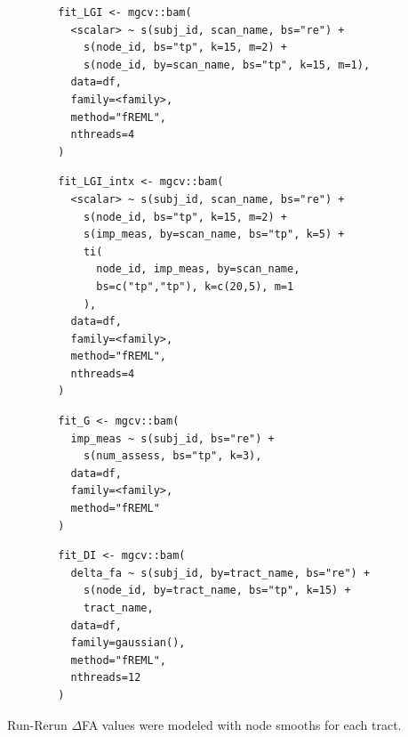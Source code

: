 \documentclass[12pt]{article}
\begin{document}
\begin{equ}[H]
	\begin{lstlisting}
		fit_LGI <- mgcv::bam(
		  <scalar> ~ s(subj_id, scan_name, bs="re") +
		    s(node_id, bs="tp", k=15, m=2) +
		    s(node_id, by=scan_name, bs="tp", k=15, m=1),
		  data=df,
		  family=<family>,
		  method="fREML",
		  nthreads=4
		)
	\end{lstlisting}
	\caption{Tract scalars are modeled as a function of tract node with thin-plate regression splines using both global and group (\lstinline{scan_name}) smooths as well as individual group wiggliness. \lstinline{<scalar>} = relevant DWI metric (AD, RD, MD, or FA), \lstinline{scan_name} = visit identifier factor (Base, Post, RTP), \lstinline{<family>} = relevant family and link function for scalar distribution.}
	\label{supp-code:gam-lgi}
\end{equ}


\begin{equ}[H]
	\begin{lstlisting}
		fit_LGI_intx <- mgcv::bam(
		  <scalar> ~ s(subj_id, scan_name, bs="re") +
		    s(node_id, bs="tp", k=15, m=2) +
		    s(imp_meas, by=scan_name, bs="tp", k=5) +
		    ti(
		      node_id, imp_meas, by=scan_name,
		      bs=c("tp","tp"), k=c(20,5), m=1
		    ),
		  data=df,
		  family=<family>,
		  method="fREML",
		  nthreads=4
		)
	\end{lstlisting}
	\caption{Tract scalars are modeled as a function of separate 1D node and ImPACT smooths as well as a 2D tensor product interaction surface. \lstinline{imp_meas} = ImPACT composite or total symptom measure.}
	\label{supp-code:gam-lgi-intx}
\end{equ}


\begin{equ}[H]
	\begin{lstlisting}
		fit_G <- mgcv::bam(
		  imp_meas ~ s(subj_id, bs="re") +
		    s(num_assess, bs="tp", k=3),
		  data=df,
		  family=<family>,
		  method="fREML"
		)
	\end{lstlisting}
	\caption{ImPACT metrics modeled as a function of number of assessments using a single global smooth. \lstinline{imp_meas} = ImPACT composite or total symptom score, \lstinline{num_assess} = assessment number (1=Base, 2=Post, 3=RTP).}
	\label{supp-code:gam-impact}
\end{equ}


\begin{equ}[H]
	\begin{lstlisting}
		fit_DI <- mgcv::bam(
		  delta_fa ~ s(subj_id, by=tract_name, bs="re") +
		    s(node_id, by=tract_name, bs="tp", k=15) +
		    tract_name,
		  data=df,
		  family=gaussian(),
		  method="fREML",
		  nthreads=12
		)
	\end{lstlisting}
	\caption{Run-Rerun $\Delta$FA values were modeled with node smooths for each tract.}
	\label{supp-code:gam-di}
\end{equ}
\end{document}
